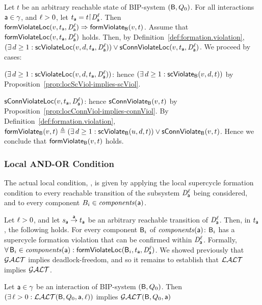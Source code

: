 \bp \label{prop:locFromViol-implies-formViol}
\label{prop:locformviol-implies-formviol}
Let $t$ be an arbitrary reachable state of BIP-system $(\B, Q_0)$.
For all interactions $\act \in \gamma$, and $\l > 0$, let $t_\act = t \pj \dsk{\act}{\l}$.
Then\\
\ind $ \locFormViol{v}{t_\act}{\act}{\l} \imp \formViol{v}{t}$.
\ep
%
\bpr
Assume that $\locFormViol{v}{t_\act}{\act}{\l}$ holds. Then, by Definition~\ref{def:formation.violation}, 
$(\exs d \ge 1: \locScViol{v}{d}{t_\act}{\act}{\l}) \lor \locConnViol{v}{t_\act}{\act}{\l}$.
We proceed by cases:
\bn
\item $(\exs d \ge 1: \locScViol{v}{d}{t_\act}{\act}{\l})$: hence $(\exs d \ge 1: \scViol{v}{d}{t})$ by Proposition~\ref{prop:locScViol-implies-scViol}.
\item $\locConnViol{v}{t_\act}{\act}{\l}$: hence $\connViol{v}{t}$ by Proposition~\ref{prop:locConnViol-implies-connViol}.
\en
By Definition~\ref{def:formation.violation},  $\formViol{v}{t}  \df (\exs d \ge 1: \scViol{u}{d}{t}) \lor \connViol{v}{t}$.
Hence we conclude that $\formViol{v}{t}$ holds.
\epr




\subsubsection{Local AND-OR Condition}

The actual local condition, \LAO, is given by applying the local supercycle formation condition to every reachable transition 
of the subsystem $\dsk{\act}{\l}$ being considered, and to every component $B_i \in \cmps{\act}$.

 \label{def:lao}
Let $\l > 0$, and let $s_\act \goesto[\act] t_\act$ be an arbitrary reachable transition of $\dsk{\act}{\l}$.
Then, in $t_\act$, the following holds. 
For every component $\B_i$ of $\cmps{\act}$:  
$\B_i$ has a supercycle formation violation that can be confirmed within $\dsk{\act}{\l}$.
Formally,\\
\ind  $\fa \B_i \in \cmps{\act} : \locFormViol{\B_i}{t_\act}{\act}{\l}$.
\ed
%
We showed previously that $\GAO$ implies deadlock-freedom, and so it remains to establish that $\LAO$ implies $\GAO$. 



\bl \label{lemma:loc.ANDOR.implies.glob.AND-OR}
\label{LAOGAO}
Let $\act \in \gamma$ be an interaction of BIP-system $(\B, Q_0)$. Then\\
\ind $(\ex \l > 0: \LAO(\B, Q_0, \act, \l))$ implies $\GAO(\B, Q_0, \act)$
\el
%

